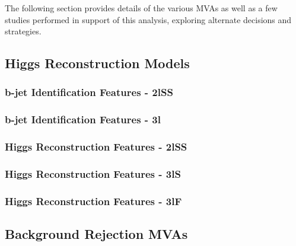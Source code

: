 
The following section provides details of the various MVAs as well as a few studies performed in support of this analysis, exploring alternate decisions and strategies. 

\subsection{Higgs Reconstruction Models}
\label{subsec:recoApx}
 
\subsubsection{b-jet Identification Features - 2lSS}


\subsubsection{b-jet Identification Features - 3l}


\subsubsection{Higgs Reconstruction Features - 2lSS}


\subsubsection{Higgs Reconstruction Features - 3lS}                                                                         
 

\subsubsection{Higgs Reconstruction Features - 3lF} 
 


\subsection{Background Rejection MVAs}
\label{subsec:sigBkgApx}
 
